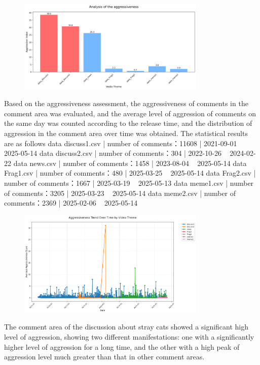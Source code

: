 \documentclass[12pt,a4paper]{ctexart}
\begin{document}
\begin{figure}[htbp]
    \centering
    \includegraphics[width=0.8\textwidth]{img/aggressive_analysis.png}
\end{figure}
\newpage

Based on the aggressiveness assessment, the aggressiveness of comments in the comment area was evaluated, and the average level of aggression of comments on the same day was counted according to the release time, and the distribution of aggression in the comment area over time was obtained.
The statistical results are as follows
data discuss1.csv | number of comments：11608 | 2021-09-01 ~ 2025-05-14
data discuss2.csv | number of comments：304 | 2022-10-26 ~ 2024-02-22
data news.csv | number of comments：1458 | 2023-08-04 ~ 2025-05-14
data Frag1.csv | number of comments：480 | 2025-03-25 ~ 2025-05-14
data Frag2.csv | number of comments：1667 | 2025-03-19 ~ 2025-05-13
data meme1.csv | number of comments：3205 | 2025-03-23 ~ 2025-05-14
data meme2.csv | number of comments：2369 | 2025-02-06 ~ 2025-05-14

\begin{figure}[htbp]
    \centering
    \includegraphics[width=0.8\textwidth]{img/aggressive_trend.png}
\end{figure}
\newpage

The comment area of the discussion about stray cats showed a significant high level of aggression, showing two different manifestations: one with a significantly higher level of aggression for a long time, and the other with a high peak of aggression level much greater than that in other comment areas.
\end{document}
